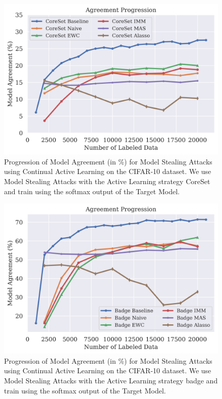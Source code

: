 \begin{figure}[h]
    \centering
    \includegraphics[width=0.7\linewidth]{images/results_CALMS/cifar100_softmax_coreset.png}
    \caption[Agreement Comparison for Model Stealing on CIFAR10 using the softmax output and the Active Learning strategy CoreSet]{Progression of Model Agreement
    (in \%) for Model Stealing Attacks using Continual Active Learning on the CIFAR-10 dataset. We use Model Stealing Attacks with the Active Learning strategy
    CoreSet and train using the softmax output of the Target Model.}
    \label{fig:CALMSCIFAR10SoftmaxCoreSet}
\end{figure}

\begin{figure}[h]
    \centering
    \includegraphics[width=0.7\linewidth]{images/results_CALMS/cifar_softmax_badge.png}
    \caption[Agreement Comparison for Model Stealing on CIFAR-10 using the softmax output and the Active Learning strategy Badge]{Progression of Model Agreement
    (in \%) for Model Stealing Attacks using Continual Active Learning on the CIFAR-10 dataset. We use Model Stealing Attacks with the Active Learning strategy
    \gls{badge} and train using the softmax output of the Target Model.}
    \label{fig:CALMSCIFAR10SoftmaxBadge}
\end{figure}


